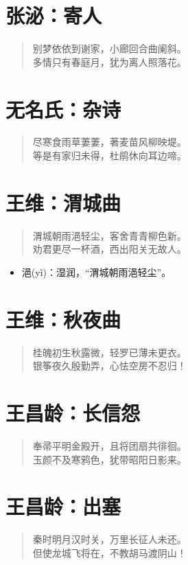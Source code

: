 \documentclass[12pt,oneside]{book}
\newenvironment{shici}{
\begin{verse}
\centering\large\hspace{12pt}}
{\end{verse}}
\begin{document}
\chapter{张泌：寄人}
\begin{shici}
别梦依依到谢家，小廊回合曲阑斜。\\
多情只有春庭月，犹为离人照落花。
\end{shici}

\chapter{无名氏：杂诗}
\begin{shici}
尽寒食雨草萋萋，著麦苗风柳映堤。\\
等是有家归未得，杜鹃休向耳边啼。
\end{shici}

\chapter{王维：渭城曲}
\begin{shici}
渭城朝雨浥轻尘，客舍青青柳色新。\\
劝君更尽一杯酒，西出阳关无故人。
\end{shici}

\begin{itemize}
\item 浥(yì)：湿润，“渭城朝雨浥轻尘”。
\end{itemize}

\chapter{王维：秋夜曲}
\begin{shici}
桂魄初生秋露微，轻罗已薄未更衣。\\
银筝夜久殷勤弄，心怯空房不忍归！
\end{shici}

\chapter{王昌龄：长信怨}
\begin{shici}
奉帚平明金殿开，且将团扇共徘徊。\\
玉颜不及寒鸦色，犹带昭阳日影来。
\end{shici}

\chapter{王昌龄：出塞}
\begin{shici}
秦时明月汉时关，万里长征人未还。\\
但使龙城飞将在，不教胡马渡阴山！
\end{shici}
\end{document}

